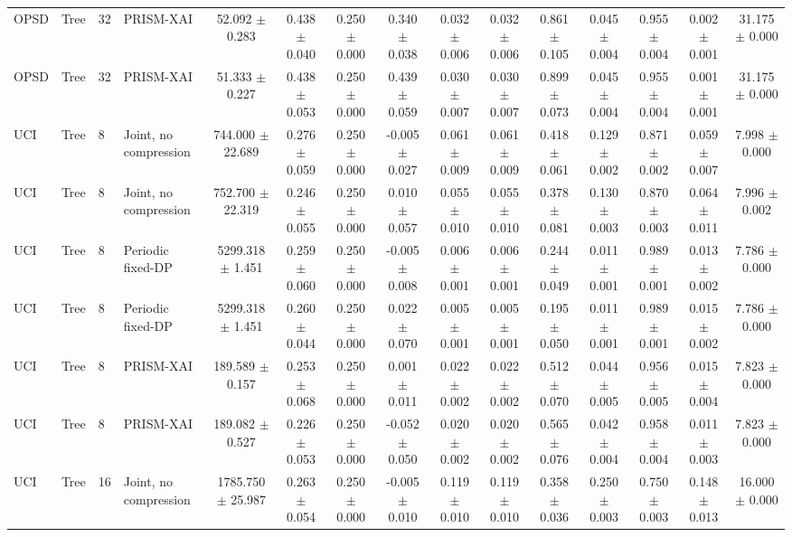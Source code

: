 \begin{table}[t]
\begin{tabular}{llllccccccccccc}
OPSD & Tree & 32 & PRISM-XAI & 52.092 $\pm$ 0.283 & 0.438 $\pm$ 0.040 & 0.250 $\pm$ 0.000 & 0.340 $\pm$ 0.038 & 0.032 $\pm$ 0.006 & 0.032 $\pm$ 0.006 & 0.861 $\pm$ 0.105 & 0.045 $\pm$ 0.004 & 0.955 $\pm$ 0.004 & 0.002 $\pm$ 0.001 & 31.175 $\pm$ 0.000 \\
OPSD & Tree & 32 & PRISM-XAI & 51.333 $\pm$ 0.227 & 0.438 $\pm$ 0.053 & 0.250 $\pm$ 0.000 & 0.439 $\pm$ 0.059 & 0.030 $\pm$ 0.007 & 0.030 $\pm$ 0.007 & 0.899 $\pm$ 0.073 & 0.045 $\pm$ 0.004 & 0.955 $\pm$ 0.004 & 0.001 $\pm$ 0.001 & 31.175 $\pm$ 0.000 \\
UCI & Tree & 8 & Joint, no compression & 744.000 $\pm$ 22.689 & 0.276 $\pm$ 0.059 & 0.250 $\pm$ 0.000 & -0.005 $\pm$ 0.027 & 0.061 $\pm$ 0.009 & 0.061 $\pm$ 0.009 & 0.418 $\pm$ 0.061 & 0.129 $\pm$ 0.002 & 0.871 $\pm$ 0.002 & 0.059 $\pm$ 0.007 & 7.998 $\pm$ 0.000 \\
UCI & Tree & 8 & Joint, no compression & 752.700 $\pm$ 22.319 & 0.246 $\pm$ 0.055 & 0.250 $\pm$ 0.000 & 0.010 $\pm$ 0.057 & 0.055 $\pm$ 0.010 & 0.055 $\pm$ 0.010 & 0.378 $\pm$ 0.081 & 0.130 $\pm$ 0.003 & 0.870 $\pm$ 0.003 & 0.064 $\pm$ 0.011 & 7.996 $\pm$ 0.002 \\
UCI & Tree & 8 & Periodic fixed-DP & 5299.318 $\pm$ 1.451 & 0.259 $\pm$ 0.060 & 0.250 $\pm$ 0.000 & -0.005 $\pm$ 0.008 & 0.006 $\pm$ 0.001 & 0.006 $\pm$ 0.001 & 0.244 $\pm$ 0.049 & 0.011 $\pm$ 0.001 & 0.989 $\pm$ 0.001 & 0.013 $\pm$ 0.002 & 7.786 $\pm$ 0.000 \\
UCI & Tree & 8 & Periodic fixed-DP & 5299.318 $\pm$ 1.451 & 0.260 $\pm$ 0.044 & 0.250 $\pm$ 0.000 & 0.022 $\pm$ 0.070 & 0.005 $\pm$ 0.001 & 0.005 $\pm$ 0.001 & 0.195 $\pm$ 0.050 & 0.011 $\pm$ 0.001 & 0.989 $\pm$ 0.001 & 0.015 $\pm$ 0.002 & 7.786 $\pm$ 0.000 \\
UCI & Tree & 8 & PRISM-XAI & 189.589 $\pm$ 0.157 & 0.253 $\pm$ 0.068 & 0.250 $\pm$ 0.000 & 0.001 $\pm$ 0.011 & 0.022 $\pm$ 0.002 & 0.022 $\pm$ 0.002 & 0.512 $\pm$ 0.070 & 0.044 $\pm$ 0.005 & 0.956 $\pm$ 0.005 & 0.015 $\pm$ 0.004 & 7.823 $\pm$ 0.000 \\
UCI & Tree & 8 & PRISM-XAI & 189.082 $\pm$ 0.527 & 0.226 $\pm$ 0.053 & 0.250 $\pm$ 0.000 & -0.052 $\pm$ 0.050 & 0.020 $\pm$ 0.002 & 0.020 $\pm$ 0.002 & 0.565 $\pm$ 0.076 & 0.042 $\pm$ 0.004 & 0.958 $\pm$ 0.004 & 0.011 $\pm$ 0.003 & 7.823 $\pm$ 0.000 \\
UCI & Tree & 16 & Joint, no compression & 1785.750 $\pm$ 25.987 & 0.263 $\pm$ 0.054 & 0.250 $\pm$ 0.000 & -0.005 $\pm$ 0.010 & 0.119 $\pm$ 0.010 & 0.119 $\pm$ 0.010 & 0.358 $\pm$ 0.036 & 0.250 $\pm$ 0.003 & 0.750 $\pm$ 0.003 & 0.148 $\pm$ 0.013 & 16.000 $\pm$ 0.000 \\

\end{tabular}
\end{table}
